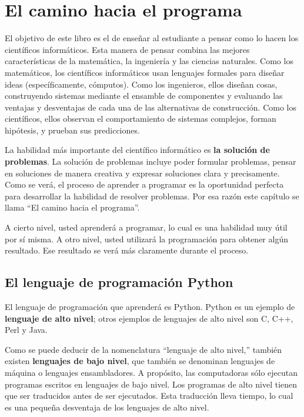 
\chapter{El camino hacia el programa}

El objetivo de este libro es el de enseñar al estudiante a pensar
como lo hacen los científicos informáticos. Esta manera de pensar
combina las mejores características de la matemática, la ingeniería
y las ciencias naturales. Como los matemáticos, los científicos informáticos
usan lenguajes formales para diseñar ideas (específicamente, cómputos).
Como los ingenieros, ellos diseñan cosas, construyendo sistemas mediante
el ensamble de componentes y evaluando las ventajas y desventajas
de cada una de las alternativas de construcción. Como los científicos,
ellos observan el comportamiento de sistemas complejos, forman hipótesis,
y prueban sus predicciones.

La habilidad más importante del científico informático es \textbf{la
solución de problemas}. La solución de problemas incluye poder formular
problemas, pensar en soluciones de manera creativa y expresar soluciones
clara y precisamente. Como se verá, el proceso de aprender a programar
es la oportunidad perfecta para desarrollar la habilidad de resolver
problemas. Por esa razón este capítulo se llama ``El camino hacia
el programa''.

A cierto nivel, usted aprenderá a programar, lo cual es una habilidad
muy útil por sí misma. A otro nivel, usted utilizará la programación
para obtener algún resultado. Ese resultado se verá más claramente
durante el proceso.

\section{El lenguaje de programación Python}

 

El lenguaje de programación que aprenderá es Python. Python es un
ejemplo de \textbf{lenguaje de alto nivel}; otros ejemplos de lenguajes
de alto nivel son C, C++, Perl y Java.

Como se puede deducir de la nomenclatura ``lenguaje de alto nivel,''
también existen \textbf{lenguajes de bajo nivel}, que también se denominan
lenguajes de máquina o lenguajes ensambladores. A propósito, las computadoras
sólo ejecutan programas escritos en lenguajes de bajo nivel. Los programas
de alto nivel tienen que ser traducidos antes de ser ejecutados. Esta
traducción lleva tiempo, lo cual es una pequeña desventaja de los
lenguajes de alto nivel.

